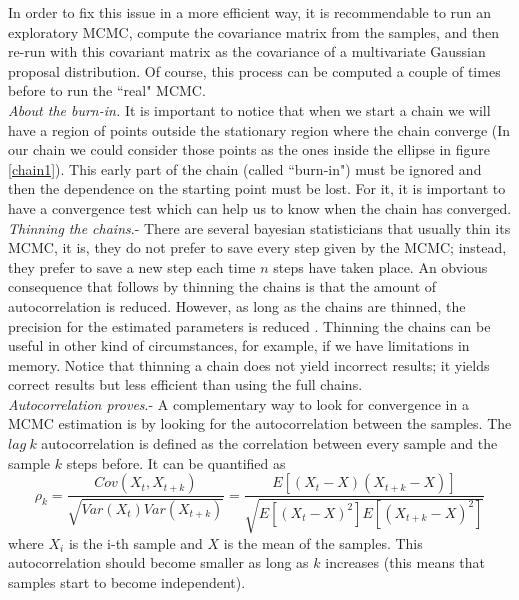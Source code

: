\documentclass[onecolumn,           %
               showpacs,            %
               preprintnumbers,     %
               aps,                 %
               prl,          	    %
               letterpaper,             %
               superscriptaddress,      %
               nofootinbib,         %
               tightenlines,        %
               floats,floatfix      %
               ,usenatbib,
               ]{revtex4-1}
\begin{document}
In order to fix this issue in a more efficient way, it is recommendable to run an exploratory MCMC, compute the covariance matrix from the samples, and then re-run with this covariant matrix as the covariance of a multivariate Gaussian proposal distribution. Of course, this process can be computed a couple of times before to run the ``real" MCMC.\\

\textit{About the burn-in.} It is important to notice that when we start a chain we will have a region of points outside the stationary region where the chain converge (In our chain we could consider those points as the ones inside the ellipse in figure \ref{chain1}). This early part of the chain (called ``burn-in") must be ignored and then the dependence on the starting point must be lost. For it, it is important to have a convergence test which can help us to know when the chain has converged.\\

 \textit{Thinning the chains}.- There are several bayesian statisticians that usually thin its MCMC, it is, they do not prefer to save every step given by the MCMC; instead, they prefer to save a new step each time $n$ steps have taken place. An obvious consequence that follows by thinning the chains is that the amount of autocorrelation is reduced. However, as long as the chains are thinned, the precision for the estimated parameters is reduced \cite{thin}. Thinning the chains can be useful in other kind of circumstances, for example, if we have limitations in memory. Notice that thinning a chain does not yield incorrect results; it yields correct results but less efficient than using the full chains.       
\\

\textit{Autocorrelation proves}.- A complementary way to look for convergence in a MCMC estimation is by looking for the autocorrelation between the samples. The $lag\ k$ autocorrelation is defined as the correlation between every sample and the sample $k$ steps before. It can be quantified as \cite{autocor}
\begin{equation}
\rho_k=\frac{Cov(X_t,X_{t+k})}{\sqrt{Var(X_t)Var(X_{t+k})}}=\frac{E[(X_t-X)(X_{t+k}-X)]}{\sqrt{E[(X_t-X)^2]E[(X_{t+k}-X)^2]}}
\end{equation}
where $X_i$ is the i-th sample and $X$ is the mean of the samples. This autocorrelation should become smaller as long as $k$ increases (this means that samples start to become independent).\\
\end{document}
